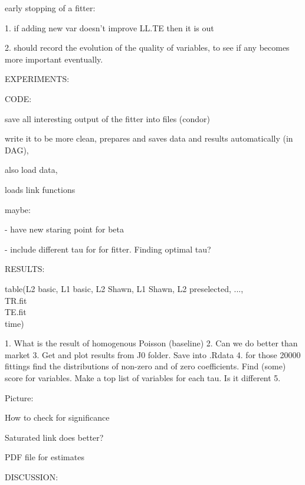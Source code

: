 \documentclass[12pt, letter]{article}
\begin{document}
early stopping of a fitter:

1. if adding new var doesn't improve LL.TE then it is out

2. should record the evolution of the quality of variables, to see if any becomes more important eventually.

EXPERIMENTS:

CODE:

save all interesting output of the fitter into files (condor)

write it to be more clean, prepares and saves data and results automatically (in DAG),

also load data,

loads link functions

maybe:

- have new staring point for beta

- include different tau for for fitter. Finding optimal tau?


RESULTS:

table(L2 basic, L1 basic, L2 Shawn, L1 Shawn, L2 preselected, ..., \\
TR.fit\\
TE.fit\\
time)

1. What is the result of homogenous Poisson (baseline)
2. Can we do better than market
3. Get and plot results from J0 folder. Save into .Rdata
4. for those 20000 fittings find the distributions of non-zero and of zero coefficients. Find (some) score for variables. Make a top list of variables for each tau. Is it different
5. 


Picture:

How to check for significance

Saturated link does better?

PDF file for estimates


DISCUSSION:



\end{document}
